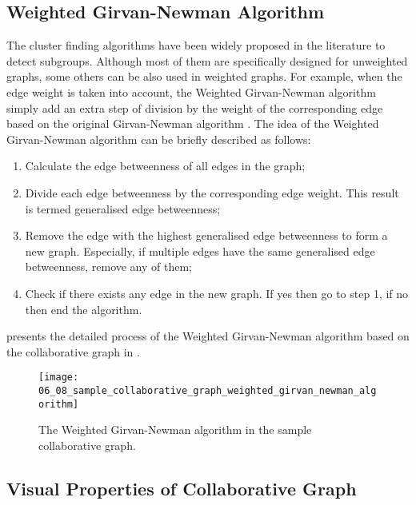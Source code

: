 \subsection{Weighted Girvan-Newman Algorithm} \label{Section:WGN}

The cluster finding algorithms have been widely proposed in the literature to detect subgroups. Although most of them are specifically designed for unweighted graphs, some others can be also used in weighted graphs. For example, when the edge weight is taken into account, the Weighted Girvan-Newman algorithm \citep{Newman2004} simply add an extra step of division by the weight of the corresponding edge based on the original Girvan-Newman algorithm \citep{Girvan2002}. The idea of the Weighted Girvan-Newman algorithm can be briefly described as follows:
\begin{enumerate}
	\item Calculate the edge betweenness of all edges in the graph; \\
	\item Divide each edge betweenness by the corresponding edge weight. This result is termed generalised edge betweenness; \\
	\item Remove the edge with the highest generalised edge betweenness to form a new graph. Especially, if multiple edges have the same generalised edge betweenness, remove any of them; \\
	\item Check if there exists any edge in the new graph. If yes then go to step 1, if no then end the algorithm.
\end{enumerate}

 presents the detailed process of the Weighted Girvan-Newman algorithm based on the collaborative graph in .

\begin{figure}[!htb]
  \centering
  \texttt{[image: 06\_08\_sample\_collaborative\_graph\_weighted\_girvan\_newman\_algorithm]}
  \caption{The Weighted Girvan-Newman algorithm in the sample collaborative graph.}
  \label{Figure:06_08}
\end{figure}

\subsection{Visual Properties of Collaborative Graph} \label{sec:collaborative_graph_visual_props}

